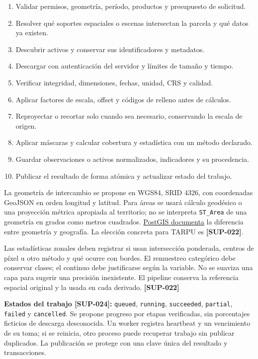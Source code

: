 \documentclass[10pt,a4paper]{article}
\begin{document}
\begin{enumerate}
\item Validar permisos, geometría, período, productos y presupuesto de solicitud.
\item Resolver qué soportes espaciales o escenas intersectan la parcela y qué datos ya existen.
\item Descubrir activos y conservar sus identificadores y metadatos.
\item Descargar con autenticación del servidor y límites de tamaño y tiempo.
\item Verificar integridad, dimensiones, fechas, unidad, CRS y calidad.
\item Aplicar factores de escala, offset y códigos de relleno antes de cálculos.
\item Reproyectar o recortar solo cuando sea necesario, conservando la escala de origen.
\item Aplicar máscaras y calcular cobertura y estadística con un método declarado.
\item Guardar observaciones o activos normalizados, indicadores y su procedencia.
\item Publicar el resultado de forma atómica y actualizar estado del trabajo.
\end{enumerate}

La geometría de intercambio se propone en WGS84, SRID 4326, con coordenadas GeoJSON en orden longitud y latitud. Para áreas se usará cálculo geodésico o una proyección métrica apropiada al territorio; no se interpreta \texttt{ST\_\allowbreak{}Area} de una geometría en grados como metros cuadrados. \href{https://postgis.net/docs/ST_Area.html}{PostGIS documenta} la diferencia entre geometría y geografía. La elección concreta para TARPU es \textbf{[SUP-022]}.


Las estadísticas zonales deben registrar si usan intersección ponderada, centros de píxel u otro método y qué ocurre con bordes. El remuestreo categórico debe conservar clases; el continuo debe justificarse según la variable. No se suaviza una capa para sugerir una precisión inexistente. El pipeline conserva la referencia espacial original y la usada en cada derivado. \textbf{[SUP-022]}


\textbf{Estados del trabajo [SUP-024]:} \texttt{queued}, \texttt{running}, \texttt{succeeded}, \texttt{partial}, \texttt{failed} y \texttt{cancelled}. Se propone progreso por etapas verificadas, sin porcentajes ficticios de descarga desconocida. Un worker registra heartbeat y un vencimiento de su toma; si se reinicia, otro proceso puede recuperar trabajo sin publicar duplicados. La publicación se protege con una clave única del resultado y transacciones.
\end{document}
